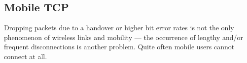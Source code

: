 %	
%	
%	


\subsection{Mobile TCP}

Dropping packets due to a handover or higher bit error rates is not the only phenomenon of wireless links and mobility — the occurrence of lengthy and/or frequent disconnections is another problem. Quite often mobile users cannot connect at all. 


